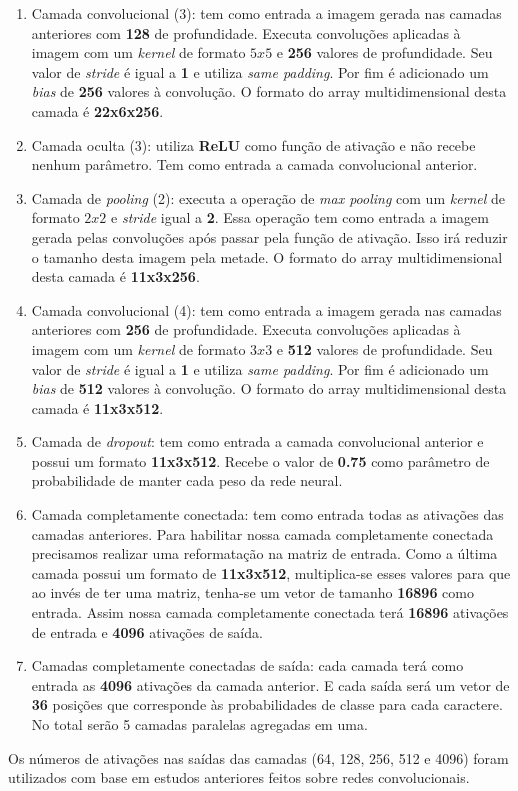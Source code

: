 \begin{enumerate}
\item Camada convolucional (3): tem como entrada a imagem gerada
  nas camadas anteriores com {\bf 128} de profundidade. Executa
  convoluções aplicadas à imagem com um \textit{kernel} de formato
  $5x5$ e {\bf 256} valores de profundidade. Seu valor de
  \textit{stride} é igual a {\bf 1} e utiliza \textit{same
    padding}. Por fim é adicionado um \textit{bias} de {\bf 256}
  valores à convolução. O formato do array multidimensional desta
  camada é {\bf 22x6x256}.

\item Camada oculta (3): utiliza {\bf ReLU} como função de ativação e
  não recebe nenhum parâmetro. Tem como entrada a camada convolucional
  anterior.

\item Camada de \textit{pooling} (2): executa a operação de
  \textit{max pooling} com um \textit{kernel} de formato $2x2$ e
  \textit{stride} igual a {\bf 2}. Essa operação tem como entrada a
  imagem gerada pelas convoluções após passar pela função de
  ativação. Isso irá reduzir o tamanho desta imagem pela metade. O
  formato do array multidimensional desta camada é {\bf 11x3x256}.

\item Camada convolucional (4): tem como entrada a imagem gerada
  nas camadas anteriores com {\bf 256} de profundidade. Executa
  convoluções aplicadas à imagem com um \textit{kernel} de formato
  $3x3$ e {\bf 512} valores de profundidade. Seu valor de
  \textit{stride} é igual a {\bf 1} e utiliza \textit{same
    padding}. Por fim é adicionado um \textit{bias} de {\bf 512}
  valores à convolução. O formato do array multidimensional desta
  camada é {\bf 11x3x512}.

\item Camada de \textit{dropout}: tem como entrada a camada
  convolucional anterior e possui um formato {\bf 11x3x512}. Recebe o
  valor de {\bf 0.75} como parâmetro de probabilidade de manter cada
  peso da rede neural.

\item Camada completamente conectada: tem como entrada todas as
  ativações das camadas anteriores. Para habilitar nossa camada
  completamente conectada precisamos realizar uma reformatação na
  matriz de entrada. Como a última camada possui um formato de {\bf
    11x3x512}, multiplica-se esses valores para que ao invés de
  ter uma matriz, tenha-se um vetor de tamanho {\bf 16896} como
  entrada. Assim nossa camada completamente conectada terá {\bf 16896}
  ativações de entrada e {\bf 4096} ativações de saída.

\item Camadas completamente conectadas de saída: cada camada terá como
  entrada as {\bf 4096} ativações da camada anterior. E cada saída
  será um vetor de {\bf 36} posições que corresponde às probabilidades
  de classe para cada caractere. No total serão 5 camadas paralelas
  agregadas em uma.

\end{enumerate}

Os números de ativações nas saídas das camadas (64, 128, 256, 512 e
4096) foram utilizados com base em estudos anteriores feitos sobre
redes convolucionais\cite{Krizhevsky}.